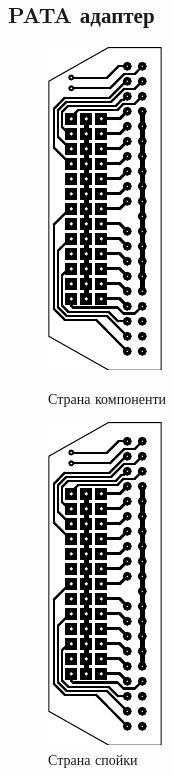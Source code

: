 \subsection{PATA адаптер}
\begin{figure}[!htb]
    \begin{minipage}{0.49\linewidth}
        \centering
        \includegraphics[page=1]{documents/pata_board.pdf}
        \caption{Страна компоненти}
        \label{fig:pata_top}
    \end{minipage}
    \hfill
    \begin{minipage}{0.49\linewidth}
        \centering
        \includegraphics[page=2]{documents/pata_board.pdf}
        \caption{Страна спойки}
        \label{fig:pata_bot}
    \end{minipage}
\end{figure}

